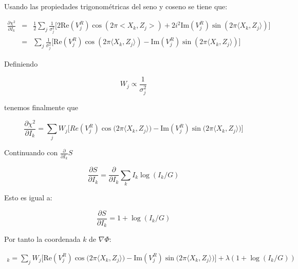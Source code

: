 Usando las propiedades trigonométricas del seno y coseno se tiene que:

\begin{eqnarray}
\frac{\partial\chi^{2}}{\partial I_{k}} & = & \frac{1}{2}\sum\limits_{j}\frac{1}{\sigma_{j}^{2}}\biggl[2\text{Re}(V_{j}^{R})\cos(2\pi <X_k,Z_j>)+2i^{2}\text{Im}(V_{j}^{R})\sin(2\pi \langle X_k,Z_j\rangle )\biggr] \\
                                      & = & \sum\limits_{j}\frac{1}{\sigma_{j}^{2}}\biggl[\text{Re}(V_{j}^{R}) \cos(2\pi\langle X_k,Z_j\rangle) - \text{Im}(V_{j}^{R})\sin(2\pi \langle X_k,Z_j\rangle)\biggr]
\end{eqnarray}

Definiendo

\begin{equation}
W_{j} \propto \frac{1}{\sigma_{j}^{2}}
\end{equation}

tenemos finalmente que

\begin{equation}
\frac{\partial\chi^{2}}{\partial I_{k}} = \sum\limits_{j}W_{j}\biggl[Re(V_{j}^{R})\cos\bigl(2\pi \langle X_k,Z_j\rangle\bigr)-\text{Im}(V_{j}^{R})\sin\bigl(2\pi \langle X_k,Z_j\rangle\bigr)\biggr]
\label{eq:dchi2}
\end{equation}

Continuando con $\frac{\partial}{\partial I_{k}}S$

\begin{equation}
\frac{\partial S}{\partial I_{k}} = \frac{\partial}{\partial I_{k}}\sum\limits_{k}I_{k}\log(I_{k}/G)
\end{equation}

Esto es igual a:


\begin{equation}
\frac{\partial S}{\partial I_{k}} = 1+\log(I_{k}/G)
\end{equation}


Por tanto la coordenada $k$ de $\nabla\Phi$:

\begin{multline}
[\nabla \Phi]_k = \sum\limits_{j}W_{j}\biggl[\text{Re}(V_{j}^{R})\cos\bigl(2\pi \langle X_k,Z_j \rangle\bigr)-\text{Im}(V_{j}^{R})\sin\bigl(2\pi \langle X_k,Z_j \rangle\bigr)\biggr] +
\lambda(1 + \log(I_{k}/G))
\label{eq:dphifinal}
\end{multline}
